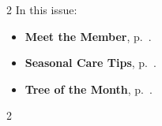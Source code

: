 \setlength{\columnsep}{-5.0cm}
\begin{multicols}{2}
    \noindent\textsf{In this issue:}
    \begin{itemize}
        \item \textsf{\textbf{Meet the Member}}, p.~\pageref{2025-08-roots}.
        \item \textsf{\textbf{Seasonal Care Tips}}, p.~\pageref{2025-08-care}.
        \item \textsf{\textbf{Tree of the Month}}, p.~\pageref{2025-08-contest}.
    \end{itemize}
    \vfill\null
    \columnbreak

    
\end{multicols}
\pagebreak

\setlength{\columnsep}{0.5cm}
\begin{multicols}{2}
    
%    
%    
%    
    
    
%    
    
\end{multicols}
